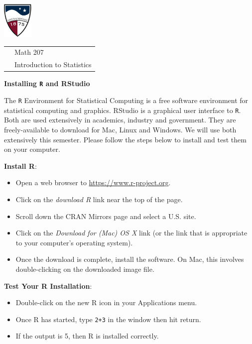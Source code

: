 \documentclass[10pt]{article}
\begin{document}
\pagestyle{empty}
\lstset{language=R, showspaces=false, showstringspaces=false}

\href{http://www.su.edu}{\includegraphics[height=1.75cm]{sulogo.eps}}
\vspace{-1.69cm}

{\small \hfill
\begin{tabular}{cl}
& Math 207\\
& Introduction to Statistics\\
\end{tabular}
}
\setlength{\baselineskip}{1.05\baselineskip}

\begin{center}
\textbf{\large  Installing \texttt{R} and RStudio}
\end{center}
\medskip

The \texttt{R} Environment for Statistical Computing 
 is a free software environment for statistical computing and graphics.
RStudio is a graphical user interface to \texttt{R}.  
Both are used extensively in academics, industry and government.
They are freely-available to download for Mac, Linux and Windows.
We will use both extensively this semester.  Please follow the steps below
to install and test them on your computer.
\medskip


\textbf{Install R}:

\begin{itemize}
\item Open a web browser to \href{https://www.r-project.org}{https://www.r-project.org}.
\item Click on the \textit{download R} link near the top of the page.
\item Scroll down the CRAN Mirrors page and select a U.S. site.
\item Click on the \textit{Download for (Mac) OS X} link (or the link that is
   appropriate to your computer's operating system).
\item Once the download is complete, install the software.  On Mac, this involves
  double-clicking on the downloaded image file.
\end{itemize}
\medskip

\textbf{Test Your R Installation}:
\begin{itemize}
\item Double-click on the new R icon in your Applications menu.
\item Once R has started, type \texttt{2+3} in the window then hit return.
\item If the output is 5, then R is installed correctly.
\end{itemize}
\medskip
\end{document}
